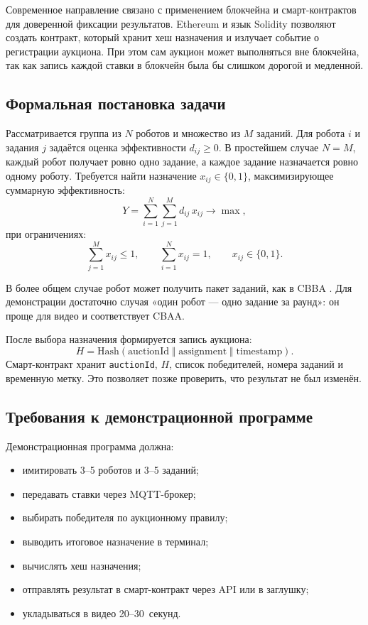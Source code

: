 \documentclass[14pt,a4paper]{extarticle}
\begin{document}
	Современное направление связано с применением блокчейна и смарт-контрактов для доверенной фиксации результатов. Ethereum и язык Solidity \cite{buterin2014,solidity} позволяют создать контракт, который хранит хеш назначения и излучает событие о регистрации аукциона. При этом сам аукцион может выполняться вне блокчейна, так как запись каждой ставки в блокчейн была бы слишком дорогой и медленной.
	
	\subsection{Формальная постановка задачи}
	
	Рассматривается группа из \(N\) роботов и множество из \(M\) заданий. Для робота \(i\) и задания \(j\) задаётся оценка эффективности \(d_{ij} \ge 0\). В простейшем случае \(N=M\), каждый робот получает ровно одно задание, а каждое задание назначается ровно одному роботу. Требуется найти назначение \(x_{ij} \in \{0,1\}\), максимизирующее суммарную эффективность:
	\[
	Y = \sum_{i=1}^{N}\sum_{j=1}^{M} d_{ij}\, x_{ij} \to \max,
	\]
	при ограничениях:
	\[
	\sum_{j=1}^{M} x_{ij} \le 1,\qquad
	\sum_{i=1}^{N} x_{ij} = 1,\qquad
	x_{ij} \in \{0,1\}.
	\]
	
	В более общем случае робот может получить пакет заданий, как в CBBA \cite{choi2009,brunet2008}. Для демонстрации достаточно случая «один робот — одно задание за раунд»: он проще для видео и соответствует CBAA.
	
	После выбора назначения формируется запись аукциона:
	\[
	H = \mathrm{Hash}(\text{auctionId} \;\Vert\; \text{assignment} \;\Vert\; \text{timestamp}).
	\]
	Смарт-контракт хранит \texttt{auctionId}, \(H\), список победителей, номера заданий и временную метку. Это позволяет позже проверить, что результат не был изменён.
	
	\subsection{Требования к демонстрационной программе}
	
	Демонстрационная программа должна:
	\begin{itemize}
		\item имитировать 3--5 роботов и 3--5 заданий;
		\item передавать ставки через MQTT-брокер;
		\item выбирать победителя по аукционному правилу;
		\item выводить итоговое назначение в терминал;
		\item вычислять хеш назначения;
		\item отправлять результат в смарт-контракт через API или в заглушку;
		\item укладываться в видео 20--30~секунд.
	\end{itemize}
	
\end{document}
